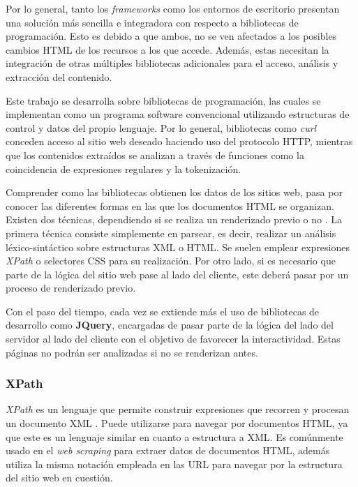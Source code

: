 Por lo general, tanto los \emph{frameworks} como los entornos de escritorio presentan una solución más
sencilla e integradora con respecto a bibliotecas de programación. Esto es debido a que ambos, no se ven
afectados a los posibles cambios HTML de los recursos a los que accede. Además, estas necesitan la
integración de otras múltiples bibliotecas adicionales para el acceso, análisis y extracción del contenido.

Este trabajo se desarrolla sobre bibliotecas de programación, las cuales se implementan como un programa
software convencional utilizando estructuras de control y datos del propio lenguaje. Por lo general,
bibliotecas como \emph{curl \cite{curl-cran}} conceden acceso al sitio web deseado haciendo uso del
protocolo HTTP, mientras que los contenidos extraídos se analizan a través de funciones como la
coincidencia de expresiones regulares y la tokenización.

Comprender como las bibliotecas obtienen los datos de los sitios web, pasa por conocer las diferentes
formas en las que los documentos HTML se organizan. Existen dos técnicas, dependiendo si se realiza un
renderizado previo o no \cite{tfg-daniel-francisco-lopez}. La primera técnica consiste simplemente en
parsear, es decir, realizar un análisis léxico-sintáctico sobre estructuras XML o HTML. Se suelen emplear
expresiones \emph{XPath} o selectores CSS para su realización. Por otro lado, si es necesario que parte de 
la lógica del sitio web pase al lado del cliente, este deberá pasar por un proceso de renderizado previo.

Con el paso del tiempo, cada vez se extiende más el uso de bibliotecas de desarrollo como \textbf{JQuery}, 
encargadas de pasar parte de la lógica del lado del servidor al lado del cliente con el objetivo de favorecer 
la interactividad. Estas páginas no podrán ser analizadas si no se renderizan antes.

\subsubsection{XPath}
\label{subsubsec:xpath}

\emph{XPath} es un lenguaje que permite construir expresiones que recorren y procesan un documento XML
\cite{css-xpath-lilland}. Puede utilizarse para navegar por documentos HTML, ya que este es un lenguaje
similar en cuanto a estructura a XML. Es comúnmente usado en el \emph{web scraping} para extraer datos
de documentos HTML, además utiliza la misma notación empleada en las URL para navegar por la estructura
del sitio web en cuestión.

